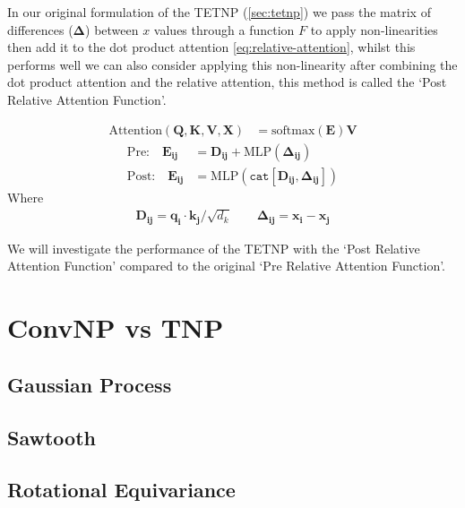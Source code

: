 \documentclass[../../main.tex]{subfiles}
\begin{document}

In our original formulation of the TETNP (\autoref{sec:tetnp}) we pass the matrix of differences ($\bm{\Delta}$) between $x$ values through a function $F$ to apply non-linearities then add it to the dot product attention \autoref{eq:relative-attention}, whilst this performs well we can also consider applying this non-linearity after combining the dot product attention and the relative attention, this method is called the `Post Relative Attention Function'. 

\begin{align}
	\text{Attention}(\bm{Q}, \bm{K}, \bm{V}, \bm{X}) &= \text{softmax}\left(\bm{E} \right) \bm{V}
\end{align}
\begin{align}
	\text{Pre:} \quad \bm{E_{ij}} &= \bm{D_{ij}}+ \text{MLP}(\bm{\Delta_{ij}})\\
    \text{Post:} \quad \bm{E_{ij}} &= \text{MLP}(\texttt{cat}[ \bm{D_{ij}}, \bm{\Delta_{ij}}])
\end{align}
Where 
\begin{align}
     \bm{D_{ij}} = \bm{q_i} \cdot \bm{k_j}  /\sqrt{d_k} \quad \quad    \bm{\Delta_{ij}} = \bm{x_i} - \bm{x_j}
\end{align}


We will investigate the performance of the TETNP with the `Post Relative Attention Function' compared to the original `Pre Relative Attention Function'.



\section{ConvNP vs TNP}

\subsection{Gaussian Process}

\subsection{Sawtooth}

\subsection{Rotational Equivariance}


\ifSubfilesClassLoaded{%
    \printbibliography{}
}{} 
\end{document}
